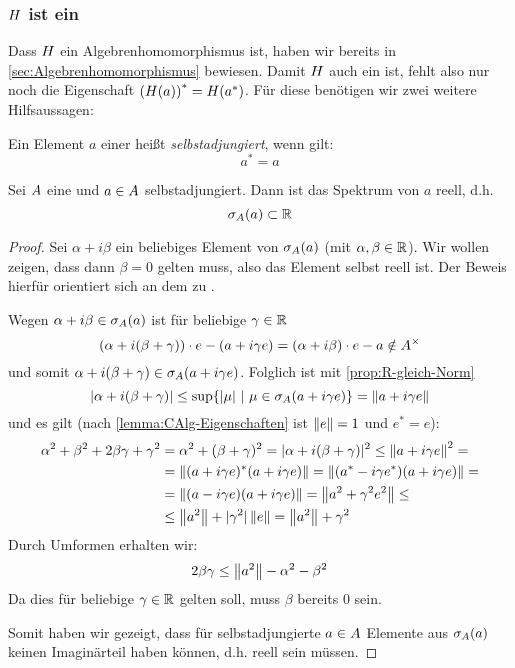 \subsubsection{$H$ ist ein \CAlgHom}\label{sec:CAlgHom}

Dass $H$ ein Algebrenhomomorphismus ist, haben wir bereits in \cref{sec:Algebrenhomomorphismus} bewiesen. Damit $H$ auch ein \CAlgHom{} ist, fehlt also nur noch die Eigenschaft $\left(H(a)\right)^* = H(a^*)$. Für diese benötigen wir zwei weitere Hilfsaussagen:

\begin{defn}[selbstadjungiert]\label{defn:selbstadjungiert}
Ein Element $a$ einer \CAlg{} heißt \emph{selbstadjungiert}, wenn gilt:
	\[a^* = a\]
\end{defn}

\begin{prop}\label{prop:Spektrum-reell}
Sei $A$ eine \CAlg{} und $a \in A$ selbstadjungiert. Dann ist das Spektrum von $a$ reell, d.h.
	\[\sigma_A(a) \subset \mathbb{R}\]
\end{prop}

\begin{proof}
Sei $\alpha + i\beta$ ein beliebiges Element von $\sigma_A(a)$ (mit $\alpha,\beta \in \mathbb{R}$). Wir wollen zeigen, dass dann $\beta = 0$ gelten muss, also das Element selbst reell ist. Der Beweis hierfür orientiert sich an dem zu \cite[Lemma IX.3.3(c)]{Werner2011}.

Wegen $\alpha +i\beta \in \sigma_A(a)$ ist	für beliebige $\gamma \in \mathbb{R}$
	\[(\alpha + i(\beta + \gamma))\cdot e - (a + i\gamma e) = (\alpha+i\beta)\cdot e - a \notin A^\times\]
und somit $\alpha + i(\beta + \gamma) \in \sigma_A(a+ i\gamma e)$. Folglich ist mit \cref{prop:R-gleich-Norm}
	\[|\alpha + i(\beta + \gamma)| \leq \sup\{|\mu| ~|~ \mu \in \sigma_A(a+ i\gamma e)\} = \left\lVert a+ i\gamma e\right\rVert\]
und es gilt (nach \cref{lemma:CAlg-Eigenschaften} ist $\left\lVert e\right\rVert = 1$ und $e^* = e$):
	\begin{align*}
	\alpha^2+\beta^2+2\beta\gamma+\gamma^2 &= \alpha^2 + (\beta+\gamma)^2 = |\alpha + i(\beta + \gamma)|^2 \leq \left\lVert a+ i\gamma e\right\rVert^2 = \\
	&= \left\lVert(a+ i\gamma e)^*(a+ i\gamma e)\right\rVert = \left\lVert(a^* - i\gamma e^*)(a+ i\gamma e)\right\rVert = \\
	&=\left\lVert(a - i\gamma e)(a+ i\gamma e)\right\rVert = \left\lVert a^2 + \gamma^2 e^2\right\rVert \leq \\
	&\leq \left\lVert a^2\right\rVert + |\gamma^2|\left\lVert e\right\rVert = \left\lVert a^2\right\rVert + \gamma^2
	\end{align*}
Durch Umformen erhalten wir:
	\[2\beta \gamma \leq \left\lVert a^2\right\rVert - \alpha^2 - \beta^2\]
Da dies für beliebige $\gamma \in \mathbb{R}$ gelten soll, muss $\beta$ bereits $0$ sein.

Somit haben wir gezeigt, dass für selbstadjungierte $a \in A$ Elemente aus $\sigma_A(a)$ keinen Imaginärteil haben können, d.h. reell sein müssen.
\end{proof}

